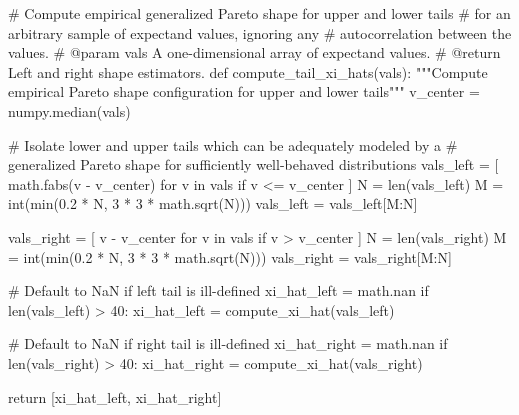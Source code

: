 \documentclass[
  letterpaper,
  DIV=11,
  numbers=noendperiod]{scrartcl}
\newenvironment{Shaded}{\begin{snugshade}}{\end{snugshade}}
\newcommand{\BuiltInTok}[1]{\textcolor[rgb]{0.00,0.23,0.31}{#1}}
\newcommand{\CommentTok}[1]{\textcolor[rgb]{0.37,0.37,0.37}{#1}}
\newcommand{\ControlFlowTok}[1]{\textcolor[rgb]{0.00,0.23,0.31}{#1}}
\newcommand{\DecValTok}[1]{\textcolor[rgb]{0.68,0.00,0.00}{#1}}
\newcommand{\FloatTok}[1]{\textcolor[rgb]{0.68,0.00,0.00}{#1}}
\newcommand{\KeywordTok}[1]{\textcolor[rgb]{0.00,0.23,0.31}{#1}}
\newcommand{\NormalTok}[1]{\textcolor[rgb]{0.00,0.23,0.31}{#1}}
\newcommand{\OperatorTok}[1]{\textcolor[rgb]{0.37,0.37,0.37}{#1}}
\begin{document}
\begin{Shaded}
\begin{Highlighting}[]
\CommentTok{\# Compute empirical generalized Pareto shape for upper and lower tails}
\CommentTok{\# for an arbitrary sample of expectand values, ignoring any}
\CommentTok{\# autocorrelation between the values.}
\CommentTok{\# @param vals A one{-}dimensional array of expectand values.}
\CommentTok{\# @return Left and right shape estimators.}
\KeywordTok{def}\NormalTok{ compute\_tail\_xi\_hats(vals):}
  \CommentTok{"""Compute empirical Pareto shape configuration for upper and lower tails"""}
\NormalTok{  v\_center }\OperatorTok{=}\NormalTok{ numpy.median(vals)}

  \CommentTok{\# Isolate lower and upper tails which can be adequately modeled by a}
  \CommentTok{\# generalized Pareto shape for sufficiently well{-}behaved distributions}
\NormalTok{  vals\_left }\OperatorTok{=}\NormalTok{ [ math.fabs(v }\OperatorTok{{-}}\NormalTok{ v\_center) }\ControlFlowTok{for}\NormalTok{ v }\KeywordTok{in}\NormalTok{ vals }\ControlFlowTok{if}\NormalTok{ v }\OperatorTok{\textless{}=}\NormalTok{ v\_center ]}
\NormalTok{  N }\OperatorTok{=} \BuiltInTok{len}\NormalTok{(vals\_left)}
\NormalTok{  M }\OperatorTok{=} \BuiltInTok{int}\NormalTok{(}\BuiltInTok{min}\NormalTok{(}\FloatTok{0.2} \OperatorTok{*}\NormalTok{ N, }\DecValTok{3} \OperatorTok{*} \DecValTok{3} \OperatorTok{*}\NormalTok{ math.sqrt(N)))}
\NormalTok{  vals\_left }\OperatorTok{=}\NormalTok{ vals\_left[M:N]}

\NormalTok{  vals\_right }\OperatorTok{=}\NormalTok{ [ v }\OperatorTok{{-}}\NormalTok{ v\_center }\ControlFlowTok{for}\NormalTok{ v }\KeywordTok{in}\NormalTok{ vals }\ControlFlowTok{if}\NormalTok{ v }\OperatorTok{\textgreater{}}\NormalTok{ v\_center ]}
\NormalTok{  N }\OperatorTok{=} \BuiltInTok{len}\NormalTok{(vals\_right)}
\NormalTok{  M }\OperatorTok{=} \BuiltInTok{int}\NormalTok{(}\BuiltInTok{min}\NormalTok{(}\FloatTok{0.2} \OperatorTok{*}\NormalTok{ N, }\DecValTok{3} \OperatorTok{*} \DecValTok{3} \OperatorTok{*}\NormalTok{ math.sqrt(N)))}
\NormalTok{  vals\_right }\OperatorTok{=}\NormalTok{ vals\_right[M:N]}

  \CommentTok{\# Default to NaN if left tail is ill{-}defined}
\NormalTok{  xi\_hat\_left }\OperatorTok{=}\NormalTok{ math.nan}
  \ControlFlowTok{if} \BuiltInTok{len}\NormalTok{(vals\_left) }\OperatorTok{\textgreater{}} \DecValTok{40}\NormalTok{:}
\NormalTok{    xi\_hat\_left }\OperatorTok{=}\NormalTok{ compute\_xi\_hat(vals\_left)}

  \CommentTok{\# Default to NaN if right tail is ill{-}defined}
\NormalTok{  xi\_hat\_right }\OperatorTok{=}\NormalTok{ math.nan}
  \ControlFlowTok{if} \BuiltInTok{len}\NormalTok{(vals\_right) }\OperatorTok{\textgreater{}} \DecValTok{40}\NormalTok{:}
\NormalTok{    xi\_hat\_right }\OperatorTok{=}\NormalTok{ compute\_xi\_hat(vals\_right)}

  \ControlFlowTok{return}\NormalTok{ [xi\_hat\_left, xi\_hat\_right]}
\end{Highlighting}
\end{Shaded}
\end{document}
